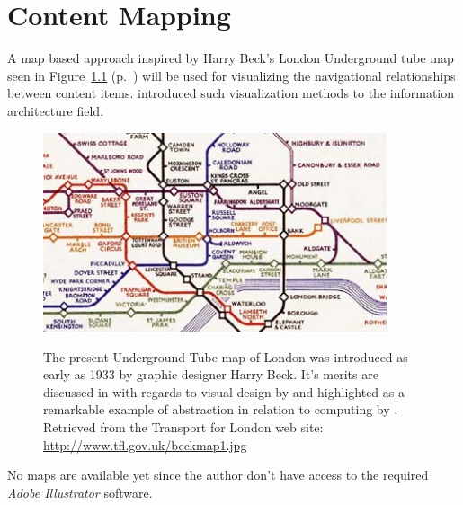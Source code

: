 \chapter{Content Mapping}

\label{appendix:content.mapping}

A map based approach inspired by Harry Beck's London Underground tube
map seen in Figure~\ref{figure:beck.1933.map}
(p.~\pageref{figure:beck.1933.map})
will be used for visualizing the navigational relationships between content
items. \citet{walsh07} introduced such visualization methods to the information
architecture field.

\begin{figure}[h]
  \begin{center}
    \label{figure:beck.1933.map}
    \includegraphics[width=0.9\textwidth]{beck_1933_map}
    \caption[1933 London Underground Tube map]{%
      The present Underground Tube map of London was introduced as early as
      1933 by graphic designer Harry Beck. It's merits are discussed
      in with regards to visual design by \citet{hadlaw03} and highlighted as
      a remarkable example of abstraction in relation to computing by
      \citet{kramer07}. Retrieved from the Transport for London web site:
      \url{http://www.tfl.gov.uk/beckmap1.jpg}}
  \end{center}
\end{figure}

No maps are available yet since the author don't have access to the required
\emph{Adobe Illustrator} software.
